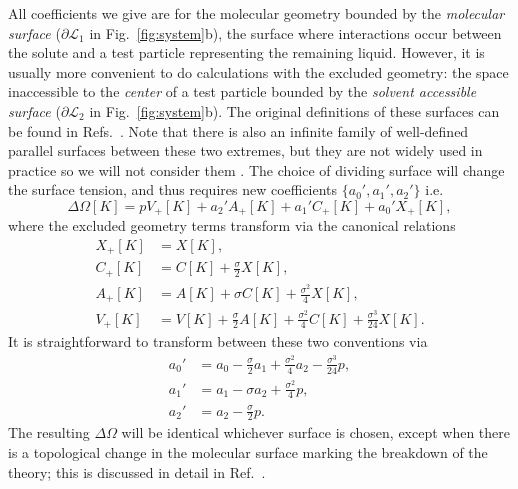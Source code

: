 \documentclass[11pt,twoside]{report}
\begin{document}
All coefficients we give are for the molecular geometry bounded by the \emph{molecular surface} ($\partial \mathcal{L}_1$ in Fig.\ \ref{fig:system}b), the surface where interactions occur between the solute and a test particle representing the remaining liquid.
However, it is usually more convenient to do calculations with the excluded geometry: the space inaccessible to the \emph{center} of a test particle bounded by the \emph{solvent accessible surface} ($\partial \mathcal{L}_2$ in Fig.\ \ref{fig:system}b).
The original definitions of these surfaces can be found in Refs.\ \cite{LeeJMB1971,RichardsARBB1977}.
Note that there is also an infinite family of well-defined parallel surfaces between these two extremes, but they are not widely used in practice so we will not consider them \cite{OettelEL2009}.
The choice of dividing surface will change the surface tension, and thus requires new coefficients $\{a_0', a_1', a_2'\}$ i.e.\
\begin{equation}
  \Delta\Omega[K]
  =
  p V_+[K]
  + a_2' A_+[K]
  + a_1' C_+[K]
  + a_0' X_+[K],
\end{equation}
where the excluded geometry terms transform via the canonical relations \cite{Hansen-GoosJPCM2006,OettelEL2009,Santalo2004,Klain1997}
\begin{subequations}\label{eq:exclusion-transform-volumes}
  \begin{align}
    X_+[K]
    &=
    X[K],
    \\
    C_+[K]
    &=
    C[K] + \frac{\sigma}{2} X[K],
    \\
    A_+[K]
    &=
    A[K] + \sigma C[K] + \frac{\sigma^2}{4} X[K],
    \\
    V_+[K]
    &=
    V[K]
    + \frac{\sigma}{2} A[K]
    + \frac{\sigma^2}{4} C[K]
    + \frac{\sigma^3}{24} X[K].
  \end{align}
\end{subequations}
It is straightforward to transform between these two conventions via \cite{Hansen-GoosJPCM2006,OettelEL2009}
\begin{subequations}\label{eq:exclusion-transform}
  \begin{align}
    a_0'
    &=
    a_0
    - \frac{\sigma}{2} a_1
    + \frac{\sigma^2}{4} a_2
    - \frac{\sigma^3}{24} p,
    \\
    a_1'
    &=
    a_1
    - \sigma a_2
    + \frac{\sigma^2}{4} p,
    \\
    a_2'
    &=
    a_2 - \frac{\sigma}{2} p.
  \end{align}
\end{subequations}
The resulting $\Delta \Omega$ will be identical whichever surface is chosen, except when there is a topological change in the molecular surface marking the breakdown of the theory; this is discussed in detail in Ref.\ \cite{OettelEL2009}.
\end{document}
